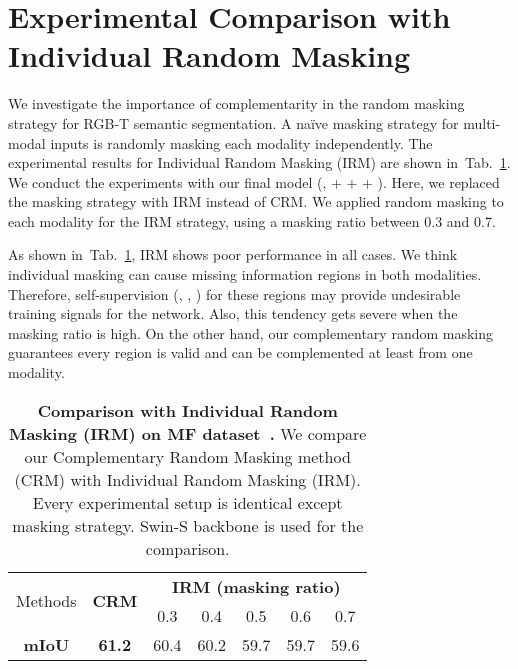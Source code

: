 \documentclass[10pt,twocolumn,letterpaper]{article}
\newcommand{\tabref}[1]{Tab.~\ref{#1}}
\begin{document}
\section{Experimental Comparison with Individual Random Masking}
We investigate the importance of complementarity in the random masking strategy for RGB-T semantic segmentation.
A na\"ive masking strategy for multi-modal inputs is randomly masking each modality independently.
The experimental results for Individual Random Masking (IRM) are shown in~\tabref{tab:abl_irm}.
We conduct the experiments with our final model (\ie,  +  +  + ). 
Here, we replaced the masking strategy with IRM instead of CRM.
We applied random masking to each modality for the IRM strategy, using a masking ratio between 0.3 and 0.7.

As shown in~\tabref{tab:abl_irm}, IRM shows poor performance in all cases.
We think individual masking can cause missing information regions in both modalities. 
Therefore, self-supervision (\eg, , ) for these regions may provide undesirable training signals for the network. 
Also, this tendency gets severe when the masking ratio is high. 
On the other hand, our complementary random masking guarantees every region is valid and can be complemented at least from one modality.


\begin{table}[h]
\caption{\textbf{Comparison with Individual Random Masking (IRM) on MF dataset~\cite{ha2017mfnet}.} 
We compare our Complementary Random Masking method (CRM) with Individual Random Masking (IRM). Every experimental setup is identical except masking strategy. Swin-S backbone is used for the comparison.}
\vspace{-0.1in}
\begin{center}
\resizebox{0.95\linewidth}{!}
{
    \def\arraystretch{1.5}
    \footnotesize
    \begin{tabular}{c|c|ccccc}
    \toprule
    \multirow{2}{*}{Methods} & \multirow{2}{*}{\textbf{CRM}} & \multicolumn{5}{c}{\textbf{IRM (masking ratio)}} \\ \cline{3-7}
     &  & 0.3 & 0.4 & 0.5 & 0.6 & 0.7 \\ 
    \hline \hline 
    {\bf mIoU} & \textbf{61.2} & 60.4 & 60.2 & 59.7 & 59.7 & 59.6 \\
    \bottomrule
    \end{tabular}
}
\end{center}
\vspace{-0.1in}
\label{tab:abl_irm}
\end{table}
\end{document}
